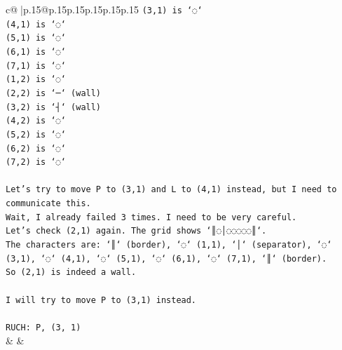 \documentclass{article}
\begin{document}
{\begin{supertabular}{c@{$\;$}|p{.15\linewidth}@{}p{.15\linewidth}p{.15\linewidth}p{.15\linewidth}p{.15\linewidth}p{.15\linewidth}}
{{{\texttt{(3,1) is `◌`} \\
\texttt{(4,1) is `◌`} \\
\texttt{(5,1) is `◌`} \\
\texttt{(6,1) is `◌`} \\
\texttt{(7,1) is `◌`} \\
\texttt{(1,2) is `◌`} \\
\texttt{(2,2) is `─` (wall)} \\
\texttt{(3,2) is `┤` (wall)} \\
\texttt{(4,2) is `◌`} \\
\texttt{(5,2) is `◌`} \\
\texttt{(6,2) is `◌`} \\
\texttt{(7,2) is `◌`} \\
\\ 
\texttt{Let's try to move P to (3,1) and L to (4,1) instead, but I need to communicate this.} \\
\texttt{Wait, I already failed 3 times. I need to be very careful.} \\
\texttt{Let's check (2,1) again. The grid shows `║◌│◌◌◌◌◌║`.} \\
\texttt{The characters are: `║` (border), `◌` (1,1), `│` (separator), `◌` (3,1), `◌` (4,1), `◌` (5,1), `◌` (6,1), `◌` (7,1), `║` (border).} \\
\texttt{So (2,1) is indeed a wall.} \\
\\ 
\texttt{I will try to move P to (3,1) instead.} \\
\\ 
\texttt{RUCH: P, (3, 1)} \\
            }
        }
    }
    & & \\ \\


\end{supertabular}}
\end{document}
